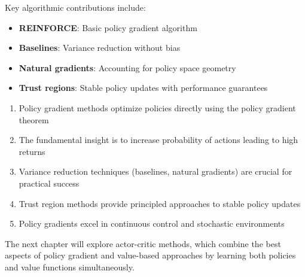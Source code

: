 Key algorithmic contributions include:
\begin{itemize}
    \item \textbf{REINFORCE}: Basic policy gradient algorithm
    \item \textbf{Baselines}: Variance reduction without bias
    \item \textbf{Natural gradients}: Accounting for policy space geometry
    \item \textbf{Trust regions}: Stable policy updates with performance guarantees
\end{itemize}

\begin{keyideabox}
\begin{enumerate}
    \item Policy gradient methods optimize policies directly using the policy gradient theorem
    \item The fundamental insight is to increase probability of actions leading to high returns
    \item Variance reduction techniques (baselines, natural gradients) are crucial for practical success
    \item Trust region methods provide principled approaches to stable policy updates
    \item Policy gradients excel in continuous control and stochastic environments
\end{enumerate}
\end{keyideabox}

The next chapter will explore actor-critic methods, which combine the best aspects of policy gradient and value-based approaches by learning both policies and value functions simultaneously.